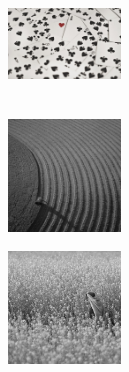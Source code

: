  
\begin{figure}[t!] %
\begin{subfigure}{0.32\textwidth}
\includegraphics[height=3cm,width=3cm]{./Figures/card.jpg}
\caption{} \label{fig:a}
\end{subfigure}\hspace*{\fill}
\begin{subfigure}{0.32\textwidth}
\includegraphics[height=3cm,width=3cm]{./Figures/field.jpg}
\caption{} \label{fig:b}
\end{subfigure}
\begin{subfigure}{0.32\textwidth}
\includegraphics[height=3cm,width=3cm]{./Figures/girl.jpg}
\caption{} \label{fig:c}
\end{subfigure}


\end{figure}

